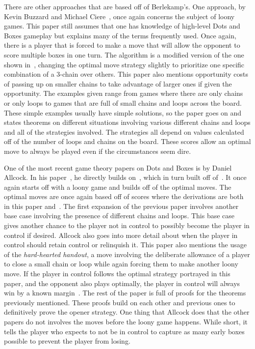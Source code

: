 \documentclass[12pt]{article}
\begin{document}
    There are other approaches that are based off of Berlekamp's. One approach, by Kevin Buzzard and Michael Ciere~\cite{buzzard2014}, once again concerns the subject of loony games. This paper still assumes that one has knowledge of high-level Dots and Boxes gameplay but explains many of the terms frequently used. Once again, there is a player that is forced to make a move that will allow the opponent to score multiple boxes in one turn. The algorithm is a modified version of the one shown in~\cite{berlekamp2000}, changing the optimal move strategy slightly to prioritize one specific combination of a 3-chain over others. This paper also mentions opportunity costs of passing up on smaller chains to take advantage of larger ones if given the opportunity. The examples given range from games where there are only chains or only loops to games that are full of small chains and loops across the board. These simple examples usually have simple solutions, so the paper goes on and states theorems on different situations involving various different chains and loops and all of the strategies involved. The strategies all depend on values calculated off of the number of loops and chains on the board. These scores allow an optimal move to always be played even if the circumstances seem dire.

    One of the most recent game theory papers on Dots and Boxes is by Daniel Allcock. In his paper~\cite{allcock2019best}, he directly builds on~\cite{buzzard2014}, which in turn built off of~\cite{berlekamp2000}. It once again starts off with a loony game and builds off of the optimal moves. The optimal moves are once again based off of scores where the derivations are both in this paper and~\cite{buzzard2014}. The first expansion of the previous paper involves another base case involving the presence of different chains and loops. This base case gives another chance to the player not in control to possibly become the player in control if desired. Allcock also goes into more detail about when the player in control should retain control or relinquish it. This paper also mentions the usage of the \emph{hard-hearted handout}, a move involving the deliberate allowance of a player to close a small chain or loop while again forcing them to make another loony move. If the player in control follows the optimal strategy portrayed in this paper, and the opponent also plays optimally, the player in control will always win by a known margin~\cite{allcock2019best}. The rest of the paper is full of proofs for the theorems previously mentioned. These proofs build on each other and previous ones to definitively prove the opener strategy. One thing that Allcock does that the other papers do not involves the moves before the loony game happens. While short, it tells the player who expects to not be in control to capture as many early boxes possible to prevent the player from losing.
    
\end{document}
